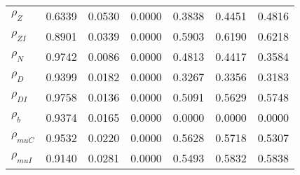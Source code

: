\begin{center}
\begin{longtable}{lcccccc}
$ {\rho_Z}             $	 & 	          0.6339	 & 	          0.0530	 & 	          0.0000	 & 	          0.3838	 & 	          0.4451	 & 	          0.4816 \\ 
$ {\rho_{ZI}}          $	 & 	          0.8901	 & 	          0.0339	 & 	          0.0000	 & 	          0.5903	 & 	          0.6190	 & 	          0.6218 \\ 
$ {\rho_N}             $	 & 	          0.9742	 & 	          0.0086	 & 	          0.0000	 & 	          0.4813	 & 	          0.4417	 & 	          0.3584 \\ 
$ {\rho_D}             $	 & 	          0.9399	 & 	          0.0182	 & 	          0.0000	 & 	          0.3267	 & 	          0.3356	 & 	          0.3183 \\ 
$ {\rho_{DI}}          $	 & 	          0.9758	 & 	          0.0136	 & 	          0.0000	 & 	          0.5091	 & 	          0.5629	 & 	          0.5748 \\ 
$ {\rho_b}             $	 & 	          0.9374	 & 	          0.0165	 & 	          0.0000	 & 	          0.0000	 & 	          0.0000	 & 	          0.0000 \\ 
$ {\rho_{muC}}         $	 & 	          0.9532	 & 	          0.0220	 & 	          0.0000	 & 	          0.5628	 & 	          0.5718	 & 	          0.5307 \\ 
$ {\rho_{muI}}         $	 & 	          0.9140	 & 	          0.0281	 & 	          0.0000	 & 	          0.5493	 & 	          0.5832	 & 	          0.5838 \\ 
\end{longtable}
 \end{center}
